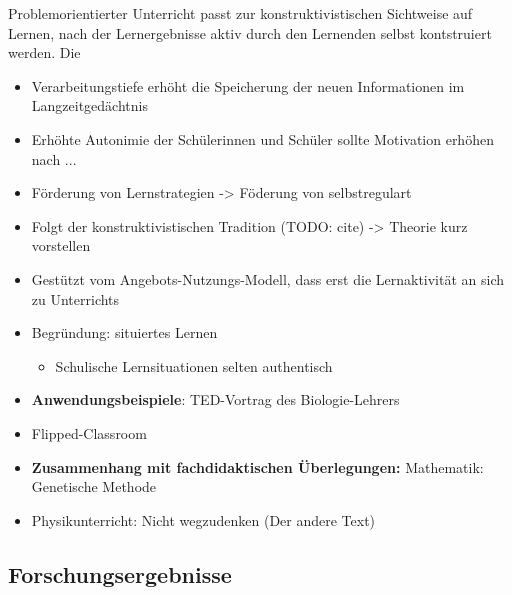 \documentclass[jour,12pt,a4paper]{apa6}
\begin{document}
Problemorientierter Unterricht passt zur konstruktivistischen Sichtweise auf Lernen, nach der Lernergebnisse aktiv durch den Lernenden selbst kontstruiert werden\cite{reiss2012}. Die 

\begin{itemize}
  \item Verarbeitungstiefe erhöht die Speicherung der neuen Informationen im Langzeitgedächtnis\cite{seidel2014}
  \item Erhöhte Autonimie der Schülerinnen und Schüler sollte Motivation erhöhen nach ...
  \item Förderung von Lernstrategien -> Föderung von selbstregulart
  \item Folgt der konstruktivistischen Tradition (TODO: cite) -> Theorie kurz vorstellen
  \item Gestützt vom Angebots-Nutzungs-Modell, dass erst die Lernaktivität an sich zu Unterrichts
  \item Begründung: situiertes Lernen \cite{reusser2005}

    \begin{itemize}
      \item Schulische Lernsituationen selten authentisch
    \end{itemize}

  \item \textbf{Anwendungsbeispiele}: TED-Vortrag des Biologie-Lehrers
  \item Flipped-Classroom

  \item \textbf{Zusammenhang mit fachdidaktischen Überlegungen:} Mathematik: Genetische Methode
  \item Physikunterricht: Nicht wegzudenken (Der andere Text)
\end{itemize}

\subsection{Forschungsergebnisse}
\end{document}
